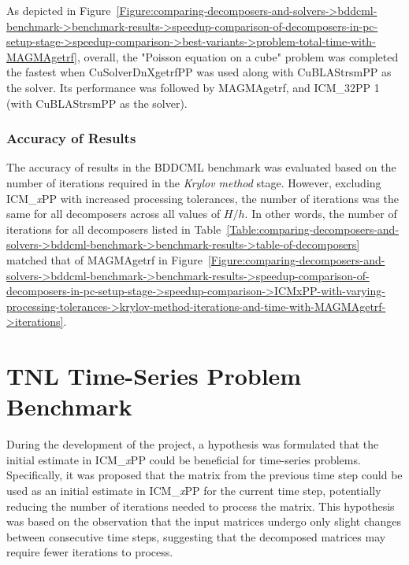 As depicted in Figure~\ref{Figure:comparing-decomposers-and-solvers->bddcml-benchmark->benchmark-results->speedup-comparison-of-decomposers-in-pc-setup-stage->speedup-comparison->best-variants->problem-total-time-with-MAGMAgetrf}, overall, the "Poisson equation on a cube" problem was completed the fastest when CuSolverDnXgetrfPP was used along with CuBLAStrsmPP as the solver.
Its performance was followed by MAGMAgetrf, and ICM\_32PP 1 (with CuBLAStrsmPP as the solver).

\subsubsection{Accuracy of Results} The accuracy of results in the BDDCML benchmark was evaluated based on the number of iterations required in the \textit{Krylov method} stage.
However, excluding ICM\_\textit{x}PP with increased processing tolerances, the number of iterations was the same for all decomposers across all values of $H/h$.
In other words, the number of iterations for all decomposers listed in Table~\ref{Table:comparing-decomposers-and-solvers->bddcml-benchmark->benchmark-results->table-of-decomposers} matched that of MAGMAgetrf in Figure~\ref{Figure:comparing-decomposers-and-solvers->bddcml-benchmark->benchmark-results->speedup-comparison-of-decomposers-in-pc-setup-stage->speedup-comparison->ICMxPP-with-varying-processing-tolerances->krylov-method-iterations-and-time-with-MAGMAgetrf->iterations}.




\section{TNL Time-Series Problem Benchmark}\label{Section:comparing-decomposers-and-solvers->tnl-time-series-problem-benchmark}
During the development of the project, a hypothesis was formulated that the initial estimate in ICM\_\textit{x}PP could be beneficial for time-series problems.
Specifically, it was proposed that the  matrix from the previous time step could be used as an initial estimate in ICM\_\textit{x}PP for the current time step, potentially reducing the number of iterations needed to process the matrix.
This hypothesis was based on the observation that the input matrices undergo only slight changes between consecutive time steps, suggesting that the decomposed matrices may require fewer iterations to process.

